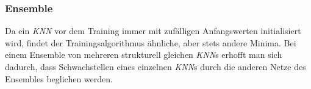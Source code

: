 \subsubsection{Ensemble}

Da ein \textit{KNN} vor dem Training immer mit zufälligen Anfangswerten initialisiert wird, findet der Trainingsalgorithmus ähnliche, aber stets andere Minima. Bei einem Ensemble von mehreren strukturell gleichen \textit{KNN}s erhofft man sich dadurch, dass Schwachstellen eines einzelnen \textit{KNN}s durch die anderen Netze des Ensembles beglichen werden.























